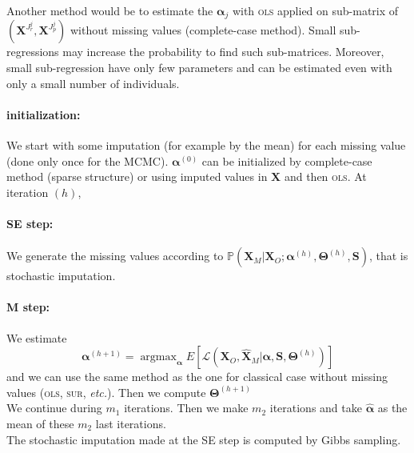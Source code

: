 \documentclass[12pt,a4paper]{report}
\begin{document}
	Another method would be to estimate the $\boldsymbol{\alpha}_j$ with \textsc{ols} applied on sub-matrix of $(\boldsymbol{X}^{J_r^j},\boldsymbol{X}^{J_p^j})$ without missing values (complete-case method). Small sub-regressions may increase the probability to find such sub-matrices. Moreover, small sub-regression have only few parameters and can be estimated even with only a small number of individuals.
		
	
	\paragraph{initialization:} We start with some imputation (for example by the mean) for each missing value (done only once for the MCMC). $\boldsymbol{\alpha}^{(0)}$ can be initialized by complete-case method	(sparse structure) or using imputed values in $\boldsymbol{X}$ and then \textsc{ols}.
	At iteration $(h)$,
	\paragraph{SE step:}
		We generate the missing values according to $\mathbb{P}(\boldsymbol{X}_M|\boldsymbol{X}_O; \boldsymbol{\alpha}^{(h)},\boldsymbol{\Theta}^{(h)},\boldsymbol{S})$, that is stochastic imputation.
	\paragraph{M step:}
		We estimate 
		\begin{equation}
	\boldsymbol{\alpha}^{(h+1)}=\operatorname{argmax}_{\boldsymbol{\alpha}}E\left[\mathcal{L}(\boldsymbol{X}_O,\hat{\boldsymbol{X}}_M|\boldsymbol{\alpha},\boldsymbol{S},\boldsymbol{\Theta}^{(h)}) \right]  \nonumber 
\end{equation}
and we can use the same method as the one for classical case without missing values (\textsc{ols}, \textsc{sur}, {\it etc.}). Then we compute $\boldsymbol{\Theta}^{(h+1)}$ \\

		We continue during $m_1$ iterations. Then we make $m_2$ iterations and take $\hat{\boldsymbol{\alpha}}$ as the mean of these $m_2$ last iterations.\\
		
	The stochastic imputation made at the SE step is computed by Gibbs sampling.
\end{document}
